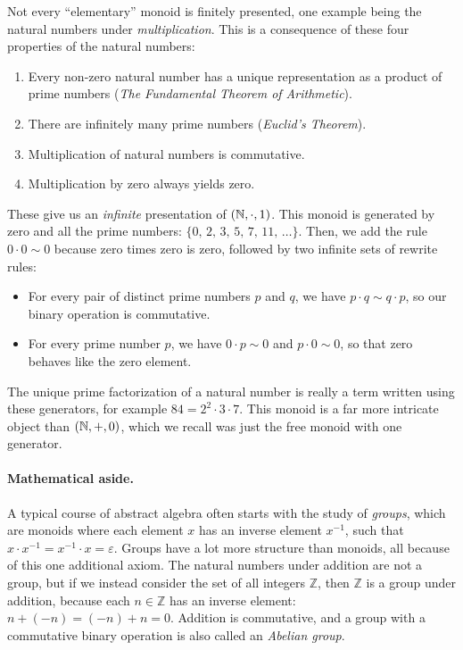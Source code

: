 \documentclass[../generics]{subfiles}
\begin{document}
\begin{example}
Not every ``elementary'' monoid is finitely presented, one example being the natural numbers under \emph{multiplication}. This is a consequence of these four properties of the natural numbers:
\begin{enumerate}
\item Every non-zero natural number has a unique representation as a product of prime numbers (\emph{The Fundamental Theorem of Arithmetic}).
\item There are infinitely many prime numbers (\emph{Euclid's Theorem}).
\item Multiplication of natural numbers is commutative.
\item Multiplication by zero always yields zero.
\end{enumerate}
These give us an \emph{infinite} presentation of $(\mathbb{N},\cdot,1)$. This monoid is generated by zero and all the prime numbers: $\{0,\,2,\,3,\,5,\,7,\,11,\,\ldots\}$. Then, we add the rule $0\cdot 0\sim 0$ because zero times zero is zero, followed by two infinite sets of rewrite rules:
\begin{itemize}
\item For every pair of distinct prime numbers $p$ and $q$, we have $p\cdot q\sim q\cdot p$, so our binary operation is commutative.
\item For every prime number $p$, we have $0\cdot p\sim 0$ and $p\cdot 0\sim 0$, so that zero behaves like  the zero element.
\end{itemize}
The unique prime factorization of a natural number is really a term written using these generators, for example $84=2^2\cdot 3\cdot 7$. This monoid is a far more intricate object than $(\mathbb{N},+,0)$, which we recall was just the free monoid with one generator.
\end{example}

\paragraph{Mathematical aside.}
A typical course of abstract algebra often starts with the study of \emph{groups}, which are monoids where each element $x$ has an inverse element $x^{-1}$, such that $x\cdot x^{-1}=x^{-1}\cdot x=\varepsilon$. Groups have a lot more structure than monoids, all because of this one additional axiom. The natural numbers under addition are not a group, but if we instead consider the set of all integers $\mathbb{Z}$, then $\mathbb{Z}$ is a group under addition, because each $n\in\mathbb{Z}$ has an inverse element: $n+(-n)=(-n)+n=0$. Addition is commutative, and a group with a commutative binary operation is also called an \emph{Abelian group}.
\end{document}
